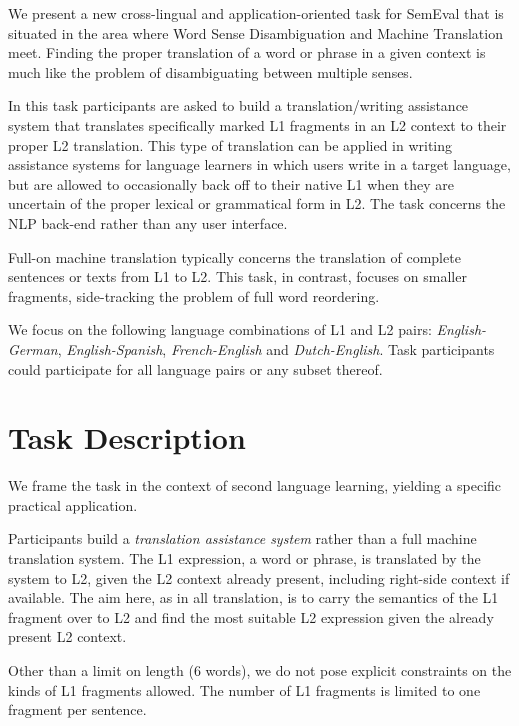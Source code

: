 
We present a new cross-lingual and application-oriented task for SemEval that
is situated in the area where Word Sense Disambiguation and Machine Translation
meet. Finding the proper translation of a word or phrase in a given context is
much like the problem of disambiguating between multiple senses.

In this task participants are asked to build a translation/writing assistance
system that translates specifically marked L1 fragments in an L2 context to
their proper L2 translation. This type of translation can be applied in writing
assistance systems for language learners in which users write in a target
language, but are allowed to occasionally back off to their native L1 when they
are uncertain of the proper lexical or grammatical form in L2. The task
concerns the NLP back-end rather than any user interface.

Full-on machine translation typically concerns the translation of complete
sentences or texts from L1 to L2. This task, in contrast, focuses on smaller
fragments, side-tracking the problem of full word reordering.


We focus on the following language combinations of L1 and L2 pairs:
\emph{English-German}, \emph{English-Spanish}, \emph{French-English} and
\emph{Dutch-English}. Task participants could participate for all language
pairs or any subset thereof.


\section{Task Description}

We frame the task in the context of second language learning, yielding a
specific practical application. 

Participants build a \emph{translation assistance system}\/ rather than a full
machine translation system. The L1 expression, a word or phrase, is translated
by the system to L2, given the L2 context already present, including right-side
context if available. The aim here, as in all translation, is to carry the
semantics of the L1 fragment over to L2 and find the most suitable L2
expression given the already present L2 context. 

Other than a limit on length (6 words), we do not pose explicit constraints on
the kinds of L1 fragments allowed. The number of L1 fragments is limited to one
fragment per sentence.

